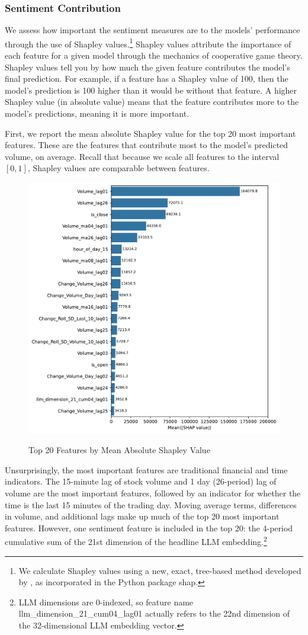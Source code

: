 \documentclass[12pt]{article}
\begin{document}
\subsubsection{Sentiment Contribution}
We assess how important the sentiment measures are to the models' performance through the use of Shapley values.\footnote{We calculate Shapley values using a new, exact, tree-based method developed by \textcite{lundberg2020local2global}, as incorporated in the Python package \textsf{shap}.} Shapley values attribute the importance of each feature for a given model through the mechanics of cooperative game theory. Shapley values tell you by how much the given feature contributes the model's final prediction. For example, if a feature has a Shapley value of 100, then the model's prediction is 100 higher than it would be without that feature. A higher Shapley value (in absolute value) means that the feature contributes more to the model's predictions, meaning it is more important.

First, we report the mean absolute Shapley value for the top 20 most important features. These are the features that contribute most to the model's predicted volume, on average. Recall that because we scale all features to the interval $[0,1]$, Shapley values are comparable between features.
\begin{figure}[H]
    \centering
    \caption{Top 20 Features by Mean Absolute Shapley Value}
    \includegraphics[width=0.75\linewidth]{../Output/shap_abs_all.pdf}
    \label{fig:shapley_overall}
\end{figure}

Unsurprisingly, the most important features are traditional financial and time indicators. The 15-minute lag of stock volume and 1 day (26-period) lag of volume are the most important features, followed by an indicator for whether the time is the last 15 minutes of the trading day. Moving average terms, differences in volume, and additional lags make up much of the top 20 most important features. However, one sentiment feature is included in the top 20: the 4-period cumulative sum of the 21st dimension of the headline LLM embedding.\footnote{LLM dimensions are 0-indexed, so feature name llm\_dimension\_21\_cum04\_lag01 actually refers to the 22nd dimension of the 32-dimensional LLM embedding vector.}
\end{document}
